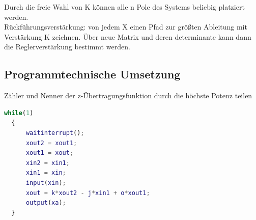 \documentclass[10pt,a4paper]{article}
\begin{document}
Durch die freie Wahl von K können alle n Pole des Systems beliebig platziert werden.\\
Rückführungsverstärkung: von jedem X einen Pfad zur größten Ableitung mit Verstärkung K zeichnen.
Über neue Matrix und deren determinante kann dann die Reglerverstärkung bestimmt werden.

\subsection{Programmtechnische Umsetzung}
Zähler und Nenner der z-Übertragungsfunktion durch die höchste Potenz teilen

\begin{lstlisting}[language=Matlab]
  while(1)
  {
      waitinterrupt();
      xout2 = xout1;
      xout1 = xout;
      xin2 = xin1;
      xin1 = xin;
      input(xin);
      xout = k*xout2 - j*xin1 + o*xout1;
      output(xa);
  }
\end{lstlisting}
\end{document}

